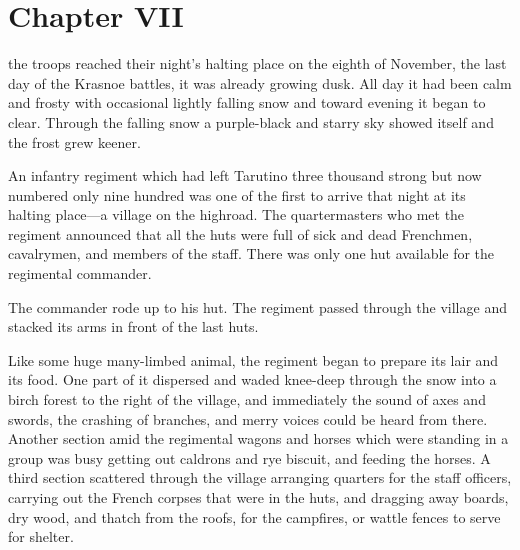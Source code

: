 
\chapter*{Chapter VII}
\ifaudio 
{}
\fi

 the troops reached their night's halting place on the eighth
of November, the last day of the Krasnoe battles, it was already
growing dusk. All day it had been calm and frosty with occasional
lightly falling snow and toward evening it began to
clear. Through the falling snow a purple-black and starry sky
showed itself and the frost grew keener.

An infantry regiment which had left Tarutino three thousand
strong but now numbered only nine hundred was one of the first to
arrive that night at its halting place---a village on the
highroad. The quartermasters who met the regiment announced that
all the huts were full of sick and dead Frenchmen, cavalrymen,
and members of the staff. There was only one hut available for
the regimental commander.

The commander rode up to his hut. The regiment passed through the
village and stacked its arms in front of the last huts.

Like some huge many-limbed animal, the regiment began to prepare
its lair and its food. One part of it dispersed and waded
knee-deep through the snow into a birch forest to the right of
the village, and immediately the sound of axes and swords, the
crashing of branches, and merry voices could be heard from
there. Another section amid the regimental wagons and horses
which were standing in a group was busy getting out caldrons and
rye biscuit, and feeding the horses. A third section scattered
through the village arranging quarters for the staff officers,
carrying out the French corpses that were in the huts, and
dragging away boards, dry wood, and thatch from the roofs, for
the campfires, or wattle fences to serve for shelter.

